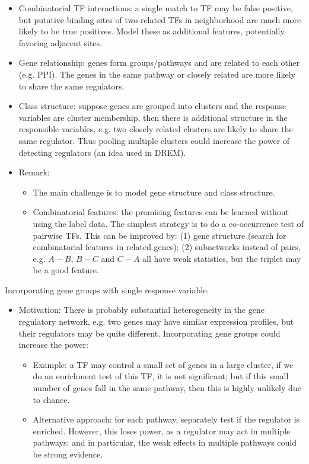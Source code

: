 \documentclass[11pt]{article}
\begin{document}
\begin{enumerate}
\begin{itemize}
\item Combinatorial TF interactions: a single match to TF may be false positive, but putative binding sites of two related TFs in neighborhood are much more likely to be true positives. Model these as additional features, potentially favoring adjacent sites. 

\item Gene relationship: genes form groups/pathways and are related to each other (e.g. PPI). The genes in the same pathway or closely related are more likely to share the same regulators.  

\item Class structure: suppose genes are grouped into clusters and the response variables are cluster membership, then there is additional structure in the responsible variables, e.g. two closely related clusters are likely to share the same regulator. Thus pooling multiple clusters could increase the power of detecting regulators (an idea used in DREM). 

\item Remark: 
\begin{itemize}
	\item The main challenge is to model gene structure and class structure. 
	\item Combinatorial features: the promising features can be learned without using the label data. The simplest strategy is to do a co-occurrence test of pairwise TFs. This can be improved by: (1) gene structure (search for combinatorial features in related genes); (2) subnetworks instead of pairs, e.g. $A-B$, $B-C$ and $C-A$ all have weak statistics, but the triplet may be a good feature.  
\end{itemize}
\end{itemize}

Incorporating gene groups with single response variable: 
\begin{itemize}
\item Motivation: There is probably substantial heterogeneity in the gene regulatory network, e.g. two genes may have similar expression profiles, but their regulators may be quite different. Incorporating gene groups could increase the power:
\begin{itemize}
	\item Example: a TF may control a small set of genes in a large cluster, if we do an enrichment test of this TF, it is not significant; but if this small number of genes fall in the same pathway, then this is highly unlikely due to chance. 
	\item Alternative approach: for each pathway, separately test if the regulator is enriched. However, this loses power, as a regulator may act in multiple pathways; and in particular, the weak effects in multiple pathways could be strong evidence. 
\end{itemize}


\end{itemize}
\end{enumerate}
\end{document}
